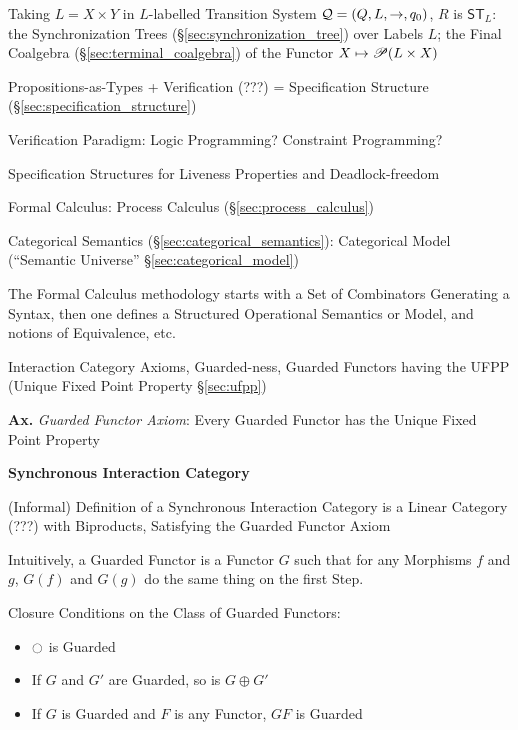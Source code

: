 Taking $L = X \times Y$ in $L$-labelled Transition System $\mathcal{Q} =
(Q,L,\rightarrow,q_0)$, $R$ is $\mathsf{ST}_L$: the Synchronization
Trees (\S\ref{sec:synchronization_tree}) over Labels $L$; the Final
Coalgebra (\S\ref{sec:terminal_coalgebra}) of the Functor $X \mapsto
\mathscr{P}(L \times X)$


\asterism


Propositions-as-Types + Verification (???) = Specification Structure
(\S\ref{sec:specification_structure})

Verification Paradigm: Logic Programming? Constraint Programming?

Specification Structures for Liveness Properties and Deadlock-freedom

Formal Calculus: Process Calculus (\S\ref{sec:process_calculus})

Categorical Semantics (\S\ref{sec:categorical_semantics}): Categorical
Model (``Semantic Universe'' \S\ref{sec:categorical_model})

The Formal Calculus methodology starts with a Set of Combinators
Generating a Syntax, then one defines a Structured Operational
Semantics or Model, and notions of Equivalence, etc.

Interaction Category Axioms, Guarded-ness, Guarded Functors having the
UFPP (Unique Fixed Point Property \S\ref{sec:ufpp}) %

\textbf{Ax.} \emph{Guarded Functor Axiom}: Every Guarded Functor has
the Unique Fixed Point Property


\textbf{Synchronous Interaction Category}

(Informal) Definition of a Synchronous Interaction Category is a
Linear Category (???) with Biproducts, Satisfying the Guarded Functor
Axiom

Intuitively, a Guarded Functor is a Functor $G$ such that for any
Morphisms $f$ and $g$, $G(f)$ and $G(g)$ do the same thing on the
first Step.

Closure Conditions on the Class of Guarded Functors:
\begin{itemize}
  \item $\ocircle$ is Guarded
  \item If $G$ and $G'$ are Guarded, so is $G \oplus G'$
  \item If $G$ is Guarded and $F$ is any Functor, $G F$ is Guarded
\end{itemize}

